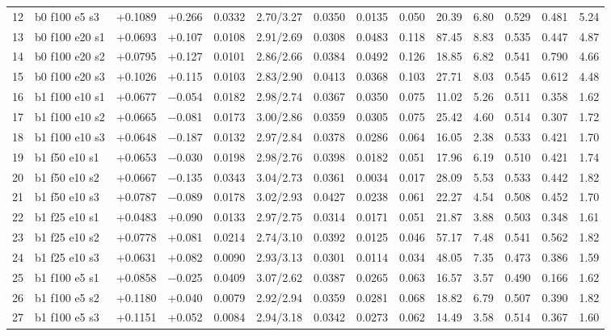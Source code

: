 \documentclass[10pt,a4paper]{article}
\begin{document}
\begin{landscape}
\begin{table}[h!]
\begin{tabular}{rlrrrrrrrrrrrr}
12 & b0 f100 e5 s3 & +0.1089 & +0.266 & 0.0332 & 2.70/3.27 & 0.0350 & 0.0135 & 0.050 & 20.39 & 6.80 & 0.529 & 0.481 & 5.24\\
13 & b0 f100 e20 s1 & +0.0693 & +0.107 & 0.0108 & 2.91/2.69 & 0.0308 & 0.0483 & 0.118 & 87.45 & 8.83 & 0.535 & 0.447 & 4.87\\
14 & b0 f100 e20 s2 & +0.0795 & +0.127 & 0.0101 & 2.86/2.66 & 0.0384 & 0.0492 & 0.126 & 18.85 & 6.82 & 0.541 & 0.790 & 4.66\\
15 & b0 f100 e20 s3 & +0.1026 & +0.115 & 0.0103 & 2.83/2.90 & 0.0413 & 0.0368 & 0.103 & 27.71 & 8.03 & 0.545 & 0.612 & 4.48\\
\midrule
16 & b1 f100 e10 s1 & +0.0677 & $-$0.054 & 0.0182 & 2.98/2.74 & 0.0367 & 0.0350 & 0.075 & 11.02 & 5.26 & 0.511 & 0.358 & 1.62\\
17 & b1 f100 e10 s2 & +0.0665 & $-$0.081 & 0.0173 & 3.00/2.86 & 0.0359 & 0.0305 & 0.075 & 25.42 & 4.60 & 0.514 & 0.307 & 1.72\\
18 & b1 f100 e10 s3 & +0.0648 & $-$0.187 & 0.0132 & 2.97/2.84 & 0.0378 & 0.0286 & 0.064 & 16.05 & 2.38 & 0.533 & 0.421 & 1.70\\
19 & b1 f50 e10 s1 & +0.0653 & $-$0.030 & 0.0198 & 2.98/2.76 & 0.0398 & 0.0182 & 0.051 & 17.96 & 6.19 & 0.510 & 0.421 & 1.74\\
20 & b1 f50 e10 s2 & +0.0667 & $-$0.135 & 0.0343 & 3.04/2.73 & 0.0361 & 0.0034 & 0.017 & 28.09 & 5.53 & 0.533 & 0.442 & 1.82\\
21 & b1 f50 e10 s3 & +0.0787 & $-$0.089 & 0.0178 & 3.02/2.93 & 0.0427 & 0.0238 & 0.061 & 22.27 & 4.54 & 0.508 & 0.452 & 1.70\\
22 & b1 f25 e10 s1 & +0.0483 & +0.090 & 0.0133 & 2.97/2.75 & 0.0314 & 0.0171 & 0.051 & 21.87 & 3.88 & 0.503 & 0.348 & 1.61\\
23 & b1 f25 e10 s2 & +0.0778 & +0.081 & 0.0214 & 2.74/3.10 & 0.0392 & 0.0125 & 0.046 & 57.17 & 7.48 & 0.541 & 0.562 & 1.82\\
24 & b1 f25 e10 s3 & +0.0631 & +0.082 & 0.0090 & 2.93/3.13 & 0.0301 & 0.0114 & 0.034 & 48.05 & 7.35 & 0.473 & 0.386 & 1.59\\
25 & b1 f100 e5 s1 & +0.0858 & $-$0.025 & 0.0409 & 3.07/2.62 & 0.0387 & 0.0265 & 0.063 & 16.57 & 3.57 & 0.490 & 0.166 & 1.62\\
26 & b1 f100 e5 s2 & +0.1180 & +0.040 & 0.0079 & 2.92/2.94 & 0.0359 & 0.0281 & 0.068 & 18.82 & 6.79 & 0.507 & 0.390 & 1.82\\
27 & b1 f100 e5 s3 & +0.1151 & +0.052 & 0.0084 & 2.94/3.18 & 0.0342 & 0.0273 & 0.062 & 14.49 & 3.58 & 0.514 & 0.367 & 1.60\\

\end{tabular}
\end{table}
\end{landscape}
\end{document}
